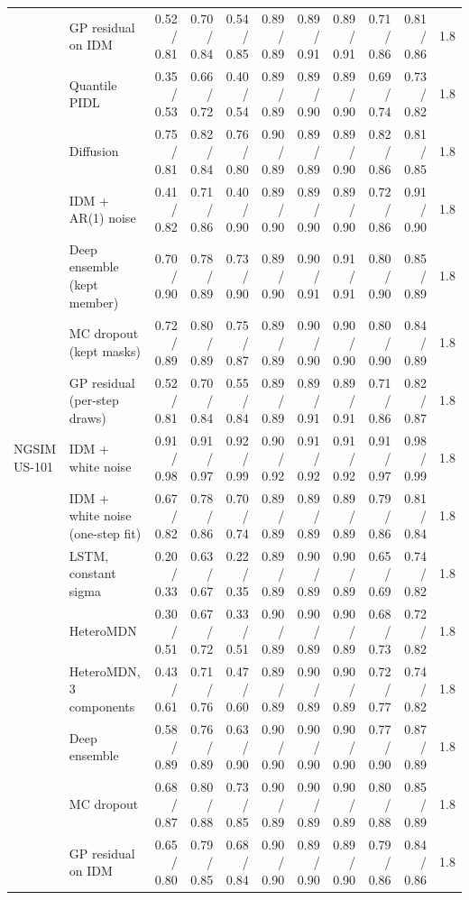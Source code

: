 \begin{longtable}{llrrrrrrrrr}
 & GP residual on IDM & 0.52 / 0.81 & 0.70 / 0.84 & 0.54 / 0.85 & 0.89 / 0.89 & 0.89 / 0.91 & 0.89 / 0.91 & 0.71 / 0.86 & 0.81 / 0.86 & 1.8 \\
 & Quantile PIDL & 0.35 / 0.53 & 0.66 / 0.72 & 0.40 / 0.54 & 0.89 / 0.89 & 0.89 / 0.90 & 0.89 / 0.90 & 0.69 / 0.74 & 0.73 / 0.82 & 1.8 \\
 & Diffusion & 0.75 / 0.81 & 0.82 / 0.84 & 0.76 / 0.80 & 0.90 / 0.89 & 0.89 / 0.89 & 0.89 / 0.90 & 0.82 / 0.86 & 0.81 / 0.85 & 1.8 \\
 & IDM + AR(1) noise & 0.41 / 0.82 & 0.71 / 0.86 & 0.40 / 0.90 & 0.89 / 0.90 & 0.89 / 0.90 & 0.89 / 0.90 & 0.72 / 0.86 & 0.91 / 0.90 & 1.8 \\
 & Deep ensemble (kept member) & 0.70 / 0.90 & 0.78 / 0.89 & 0.73 / 0.90 & 0.89 / 0.90 & 0.90 / 0.91 & 0.91 / 0.91 & 0.80 / 0.90 & 0.85 / 0.89 & 1.8 \\
 & MC dropout (kept masks) & 0.72 / 0.89 & 0.80 / 0.89 & 0.75 / 0.87 & 0.89 / 0.89 & 0.90 / 0.90 & 0.90 / 0.90 & 0.80 / 0.90 & 0.84 / 0.89 & 1.8 \\
 & GP residual (per-step draws) & 0.52 / 0.81 & 0.70 / 0.84 & 0.55 / 0.84 & 0.89 / 0.89 & 0.89 / 0.91 & 0.89 / 0.91 & 0.71 / 0.86 & 0.82 / 0.87 & 1.8 \\
\midrule
NGSIM US-101 & IDM + white noise & 0.91 / 0.98 & 0.91 / 0.97 & 0.92 / 0.99 & 0.90 / 0.92 & 0.91 / 0.92 & 0.91 / 0.92 & 0.91 / 0.97 & 0.98 / 0.99 & 1.8 \\
 & IDM + white noise (one-step fit) & 0.67 / 0.82 & 0.78 / 0.86 & 0.70 / 0.74 & 0.89 / 0.89 & 0.89 / 0.89 & 0.89 / 0.89 & 0.79 / 0.86 & 0.81 / 0.84 & 1.8 \\
 & LSTM, constant sigma & 0.20 / 0.33 & 0.63 / 0.67 & 0.22 / 0.35 & 0.89 / 0.89 & 0.90 / 0.89 & 0.90 / 0.89 & 0.65 / 0.69 & 0.74 / 0.82 & 1.8 \\
 & HeteroMDN & 0.30 / 0.51 & 0.67 / 0.72 & 0.33 / 0.51 & 0.90 / 0.89 & 0.90 / 0.89 & 0.90 / 0.89 & 0.68 / 0.73 & 0.72 / 0.82 & 1.8 \\
 & HeteroMDN, 3 components & 0.43 / 0.61 & 0.71 / 0.76 & 0.47 / 0.60 & 0.89 / 0.89 & 0.90 / 0.89 & 0.90 / 0.89 & 0.72 / 0.77 & 0.74 / 0.82 & 1.8 \\
 & Deep ensemble & 0.58 / 0.89 & 0.76 / 0.89 & 0.63 / 0.90 & 0.90 / 0.90 & 0.90 / 0.90 & 0.90 / 0.90 & 0.77 / 0.90 & 0.87 / 0.89 & 1.8 \\
 & MC dropout & 0.68 / 0.87 & 0.80 / 0.88 & 0.73 / 0.85 & 0.90 / 0.89 & 0.90 / 0.89 & 0.90 / 0.89 & 0.80 / 0.88 & 0.85 / 0.89 & 1.8 \\
 & GP residual on IDM & 0.65 / 0.80 & 0.79 / 0.85 & 0.68 / 0.84 & 0.90 / 0.90 & 0.89 / 0.90 & 0.89 / 0.90 & 0.79 / 0.86 & 0.84 / 0.86 & 1.8 \\

\end{longtable}
